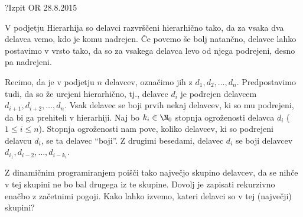 \begin{naloga}{?}{Izpit OR 28.8.2015}
\begin{vprasanje}
V podjetju Hierarhija so delavci razvrščeni hierarhično tako,
da za vsaka dva delavca vemo, kdo je komu nadrejen.
Če povemo še bolj natančno, delavce lahko postavimo v vrsto tako,
da so za vsakega delavca levo od njega podrejeni, desno pa nadrejeni.

Recimo, da je v podjetju $n$ delavcev, označimo jih z $d_1, d_2, \dots, d_n$.
Predpostavimo tudi, da so že urejeni hierarhično,
tj., delavec $d_i$ je podrejen delavcem $d_{i+1}, d_{i+2}, \dots, d_n$.
Vsak delavec se boji prvih nekaj delavcev, ki so mu podrejeni,
da bi ga prehiteli v hierarhiji.
Naj bo $k_i \in \N_0$ stopnja ogroženosti delavca $d_i$ ($1 \le i \le n$).
Stopnja ogroženosti nam pove,
koliko delavcev, ki so podrejeni delavcu $d_i$, se ta delavec ``boji''.
Z drugimi besedami,
delavec $d_i$ se boji delavcev $d_{i_1}, d_{i-2}, \dots, d_{i-k_i}$.

Z dinamičnim programiranjem poišči tako največjo skupino delavcev,
da se nihče v tej skupini ne bo bal drugega iz te skupine.
Dovolj je zapisati rekurzivno enačbo z začetnimi pogoji.
Kako lahko izvemo, kateri delavci so v tej (največji) skupini?
\end{vprasanje}
\begin{odgovor}
\end{odgovor}
\end{naloga}
